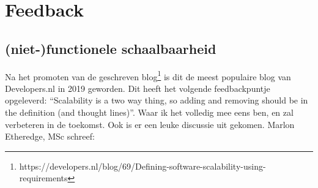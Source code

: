 
\chapter{Feedback} %

\label{Feedback} 

\section{(niet-)functionele schaalbaarheid}

\label{feedbackschaalbaarheid}

Na het promoten van de geschreven blog\footnote{https://developers.nl/blog/69/Defining-software-scalability-using-requirements} is dit de meest populaire blog van Developers.nl in 2019 geworden. Dit heeft het volgende feedbackpuntje opgeleverd: \enquote{Scalability is a two way thing, so adding and removing should be in the definition (and thought lines)}. Waar ik het volledig mee eens ben, en zal verbeteren in de toekomst. Ook is er een leuke discussie uit gekomen. Marlon Etheredge, MSc schreef:
